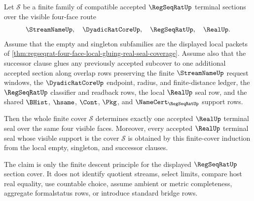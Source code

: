 \begin{theorem}
\label{thm:regseqrat-four-face-finite-cover-induction}
Let $\mathcal{S}$ be a finite family of compatible accepted
$\RegSeqRatUp$ terminal sections over the visible four-face route
$$
\StreamNameUp,\quad \DyadicRatCoreUp,\quad \RegSeqRatUp,\quad \RealUp.
$$
Assume that the empty and singleton subfamilies are the displayed local
packets of
\autoref{thm:regseqrat-four-face-local-gluing-real-seal-coverage}. Assume
also that the successor clause glues any previously accepted subcover to one
additional accepted section along overlap rows preserving the finite
$\StreamNameUp$ request windows, the $\DyadicRatCoreUp$ endpoint, radius,
and finite-distance ledger, the $\RegSeqRatUp$ classifier and readback rows,
the local $\RealUp$ seal row, and the shared $\BHist$, $\hsame$, $\Cont$,
$\Pkg$, and $\NameCert_{\RegSeqRatUp}$ support rows.

Then the whole finite cover $\mathcal{S}$ determines exactly one accepted
$\RealUp$ terminal seal over the same four visible faces. Moreover, every
accepted $\RealUp$ terminal seal whose visible support is the cover
$\mathcal{S}$ is obtained by this finite-cover induction from the local
empty, singleton, and successor clauses.

The claim is only the finite descent principle for the displayed
$\RegSeqRatUp$ section cover. It does not identify quotient streams, select
limits, compare host real equality, use countable choice, assume ambient or
metric completeness, aggregate formalstatus rows, or introduce standard
bridge rows.
\end{theorem}
